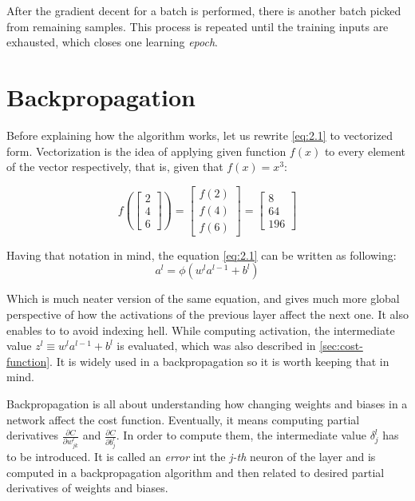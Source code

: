 After the gradient decent for a batch is performed, there is another batch picked from remaining samples. This process is repeated until the training inputs are exhausted, which closes one learning \emph{epoch}.

\section{Backpropagation}
\label{sec:backpropagation}

Before explaining how the algorithm works, let us rewrite \ref{eq:2.1} to vectorized form. Vectorization is the idea of applying given function $f(x)$ to every element of the vector respectively, that is, given that $f(x) = x^3$:

\begin{equation}
    f\left(\begin{bmatrix}
         2 \\
         4 \\
         6
    \end{bmatrix}
    \right) =
    \begin{bmatrix}
        f(2) \\
        f(4) \\
        f(6)
    \end{bmatrix} = 
    \begin{bmatrix}
        8 \\
        64 \\
        196
    \end{bmatrix}
\end{equation}

Having that notation in mind, the equation \ref{eq:2.1} can be written as following:
\begin{equation}
    a^l = \phi \left(w^la^{l-1} + b^l \right)
\end{equation}

Which is much neater version of the same equation, and gives much more global perspective of how the activations of the previous layer affect the next one. It also enables to to avoid indexing hell.
While computing activation, the intermediate value $z^l \equiv w^la^{l-1}+b^l$ is evaluated, which was also described in \ref{sec:cost-function}. It is widely used in a backpropagation so it is worth keeping that in mind.

\vspace{.5cm}

Backpropagation is all about understanding how changing weights and biases in a network affect the cost function. Eventually, it means computing partial derivatives $\frac{\partial C}{\partial w^l_{jk}}$ and $\frac{\partial C}{\partial b^l_j}$. In order to compute them, the intermediate value $\delta^l_j$ has to be introduced. It is called an \emph{error} int the \emph{j-th} neuron of the  layer and is computed in a backpropagation algorithm and then related to desired partial derivatives of weights and biases.

